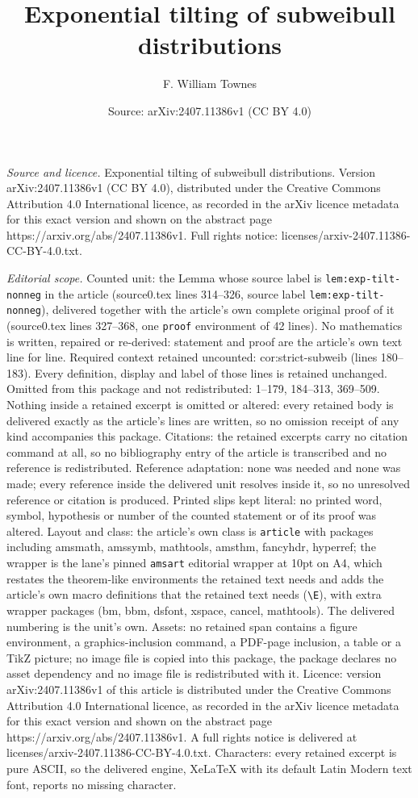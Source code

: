 \documentclass[10pt,a4paper]{amsart}
\title[Exponential tilting of subweibull distributions]{Exponential tilting of subweibull distributions}
\author{F. William Townes}
\date{Source: arXiv:2407.11386v1 (CC BY 4.0)}
\begin{document}
\maketitle

\noindent\emph{Source and licence.} Exponential tilting of subweibull distributions. Version arXiv:2407.11386v1 (CC BY 4.0), distributed under the Creative Commons Attribution 4.0 International licence, as recorded in the arXiv licence metadata for this exact version and shown on the abstract page https://arxiv.org/abs/2407.11386v1. Full rights notice: licenses/arxiv-2407.11386-CC-BY-4.0.txt.\par\smallskip

\noindent\textit{Editorial scope.} Counted unit: the Lemma whose source label is \texttt{lem:exp-tilt-nonneg} in the article (source0.tex lines 314--326, source label \texttt{lem:exp-tilt-nonneg}), delivered together with the article's own complete original proof of it (source0.tex lines 327--368, one \texttt{proof} environment of 42 lines). No mathematics is written, repaired or re-derived: statement and proof are the article's own text line for line. Required context retained uncounted: cor:strict-subweib (lines 180--183). Every definition, display and label of those lines is retained unchanged. Omitted from this package and not redistributed: 1--179, 184--313, 369--509. Nothing inside a retained excerpt is omitted or altered: every retained body is delivered exactly as the article's lines are written, so no omission receipt of any kind accompanies this package. Citations: the retained excerpts carry no citation command at all, so no bibliography entry of the article is transcribed and no reference is redistributed. Reference adaptation: none was needed and none was made; every reference inside the delivered unit resolves inside it, so no unresolved reference or citation is produced. Printed slips kept literal: no printed word, symbol, hypothesis or number of the counted statement or of its proof was altered. Layout and class: the article's own class is \texttt{article} with packages including amsmath, amssymb, mathtools, amsthm, fancyhdr, hyperref; the wrapper is the lane's pinned \texttt{amsart} editorial wrapper at 10pt on A4, which restates the theorem-like environments the retained text needs and adds the article's own macro definitions that the retained text needs (\texttt{\textbackslash E}), with extra wrapper packages (bm, bbm, dsfont, xspace, cancel, mathtools). The delivered numbering is the unit's own. Assets: no retained span contains a figure environment, a graphics-inclusion command, a PDF-page inclusion, a table or a TikZ picture; no image file is copied into this package, the package declares no asset dependency and no image file is redistributed with it. Licence: version arXiv:2407.11386v1 of this article is distributed under the Creative Commons Attribution 4.0 International licence, as recorded in the arXiv licence metadata for this exact version and shown on the abstract page https://arxiv.org/abs/2407.11386v1. A full rights notice is delivered at licenses/arxiv-2407.11386-CC-BY-4.0.txt. Characters: every retained excerpt is pure ASCII, so the delivered engine, XeLaTeX with its default Latin Modern text font, reports no missing character.
\end{document}

